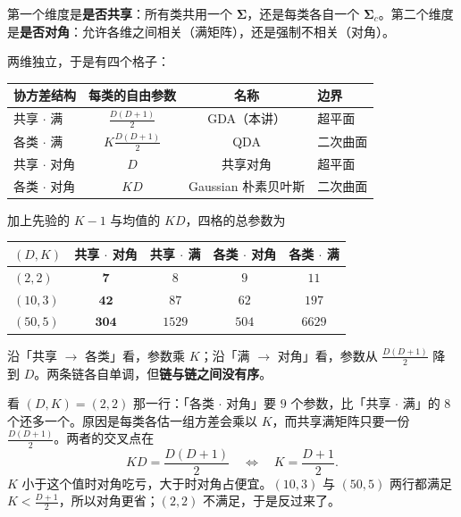 \documentclass[11pt,a4paper,fontset=windows,zihao=-4]{ctexart}
\newcommand{\bSigma}{\boldsymbol{\Sigma}}
\newcommand{\tabhead}{\sffamily\bfseries\color{navy}}
\begin{document}
第一个维度是\textbf{是否共享}：所有类共用一个 $\bSigma$，还是每类各自一个 $\bSigma_c$。第二个维度是\textbf{是否对角}：允许各维之间相关（满矩阵），还是强制不相关（对角）。

两维独立，于是有四个格子：

\begin{center}
\small
\begin{tabular}{@{}lccl@{}}
\toprule
\rowcolor{navy!7}
\tabhead 协方差结构 & \tabhead 每类的自由参数 & \tabhead 名称 & \tabhead 边界\\
\midrule
共享 $\cdot$ 满 & $\frac{D(D+1)}{2}$ & GDA（本讲） & 超平面\\
各类 $\cdot$ 满 & $K\frac{D(D+1)}{2}$ & QDA & 二次曲面\\
共享 $\cdot$ 对角 & $D$ & 共享对角 & 超平面\\
各类 $\cdot$ 对角 & $KD$ & Gaussian 朴素贝叶斯 & 二次曲面\\
\bottomrule
\end{tabular}
\end{center}

加上先验的 $K-1$ 与均值的 $KD$，四格的总参数为

\begin{center}
\small
\begin{tabular}{@{}lcccc@{}}
\toprule
\rowcolor{navy!7}
\tabhead $(D,K)$ & \tabhead 共享 $\cdot$ 对角 & \tabhead 共享 $\cdot$ 满 & \tabhead 各类 $\cdot$ 对角 & \tabhead 各类 $\cdot$ 满\\
\midrule
$(2,2)$   & $\mathbf{7}$ & $8$   & $9$   & $11$\\
$(10,3)$  & $\mathbf{42}$ & $87$  & $62$  & $197$\\
$(50,5)$  & $\mathbf{304}$ & $1529$ & $504$ & $6629$\\
\bottomrule
\end{tabular}
\end{center}

\begin{keybox}
沿「共享 $\to$ 各类」看，参数乘 $K$；沿「满 $\to$ 对角」看，参数从 $\frac{D(D+1)}{2}$ 降到 $D$。两条链各自单调，但\textbf{链与链之间没有序}。

看 $(D,K)=(2,2)$ 那一行：「各类 $\cdot$ 对角」要 $9$ 个参数，比「共享 $\cdot$ 满」的 $8$ 个还多一个。原因是每类各估一组方差会乘以 $K$，而共享满矩阵只要一份 $\frac{D(D+1)}{2}$。两者的交叉点在
\[
  KD=\frac{D(D+1)}{2}\quad\Longleftrightarrow\quad K=\frac{D+1}{2}.
\]
$K$ 小于这个值时对角吃亏，大于时对角占便宜。$(10,3)$ 与 $(50,5)$ 两行都满足 $K<\frac{D+1}{2}$，所以对角更省；$(2,2)$ 不满足，于是反过来了。
\end{keybox}
\end{document}
